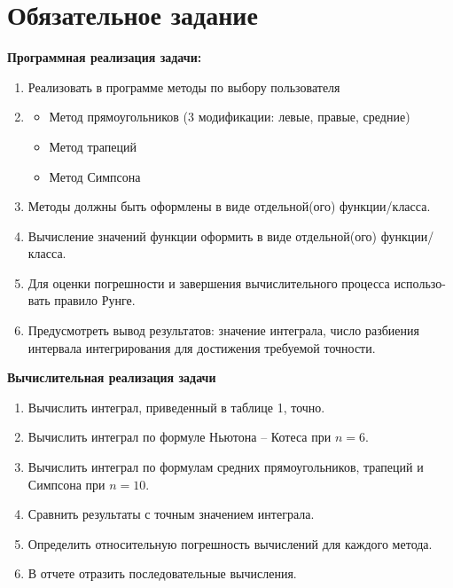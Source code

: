 \documentclass{article}
\begin{document}
\itmo[
      variant=13,
      labn=2,
      discipline=Вычислительная математика,
      group=P3212,
      student=Соколов Анатолий Владимирович,
      teacher=Наумова Надежда Александровна 
]
\lstset{language=rust}
\tableofcontents

\section{Обязательное задание}
\textbf{Программная реализация задачи:}
	\begin{enumerate}
		\item Реализовать в программе методы по выбору пользователя
		\item \begin{itemize}
			\item Метод прямоугольников (3 модификации: левые, правые, средние)
			\item Метод трапеций
			\item Метод Симпсона
		\end{itemize}
		\item Методы должны быть оформлены в виде отдельной(ого) функции/класса.
		\item Вычисление значений функции оформить в виде отдельной(ого) функции/класса.
		\item Для оценки погрешности и завершения вычислительного процесса использо-
		вать правило Рунге.
		\item Предусмотреть вывод результатов: значение интеграла, число разбиения интервала интегрирования для достижения требуемой точности.
	\end{enumerate}
\textbf{Вычислительная реализация задачи}
\begin{enumerate}
	\item Вычислить интеграл, приведенный в таблице 1, точно.
	\item Вычислить интеграл по формуле Ньютона – Котеса при $n = 6$.
	\item Вычислить интеграл по формулам средних прямоугольников, трапеций и Симпсона при $n = 10$.
	\item Сравнить результаты с точным значением интеграла.
	\item Определить относительную погрешность вычислений для каждого метода.
	\item В отчете отразить последовательные вычисления.
\end{enumerate}
\end{document}
